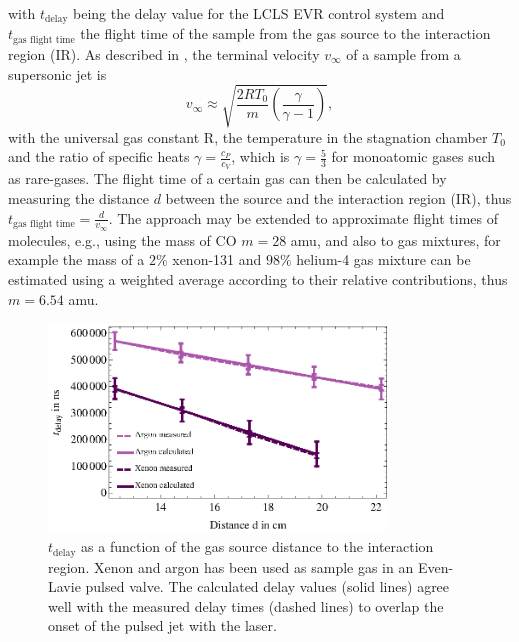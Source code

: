 with $t_{\text{delay}}$ being the delay value for the LCLS EVR control system and $t_{\text{gas flight time}}$ the flight time of the sample from the gas source to the interaction region (IR). As described in \citep{Miller-1988-Oxford}, the terminal velocity $v_{\infty}$ of a sample from a supersonic jet is
\begin{equation}
 v_{\infty} \approx \sqrt{\frac{2 R T_{0}}{m} \left(\frac{\gamma}{\gamma - 1}\right)},
\label{eqn:terminal-velocity}
\end{equation}
with the universal gas constant R, the temperature in the stagnation chamber $T_{0}$ and the ratio of specific heats $\gamma = \frac{c_{P}}{c_{V}}$, which is $\gamma = \frac{5}{3}$ for monoatomic gases such as rare-gases. The flight time of a certain gas can then be calculated by measuring the distance $d$ between the source and the interaction region (IR), thus $t_{\text{gas flight time}}=\frac{d}{v_{\infty}}$. The approach may be extended to approximate flight times of molecules, e.g., using the mass of CO $m=28$ amu, and also to gas mixtures, for example the mass of a $2\%$ xenon-131 and $98\%$ helium-4 gas mixture can be estimated using a weighted average according to their relative contributions, thus  $m = 6.54$ amu.\\
\begin{figure}
	\centering
		\includegraphics[width=0.80\textwidth]{images/gas-jet-flight-times.eps}
	\caption[Event receiver time delay at LCLS for supersonic gas jets.]{$t_{\text{delay}}$ as a function of the gas source distance to the interaction region. Xenon and argon has been used as sample gas in an Even-Lavie pulsed valve. The calculated delay values (solid lines) agree well with the measured delay times (dashed lines) to overlap the onset of the pulsed jet with the laser.}
	\label{fig:LCLS-delay-data}
\end{figure}
